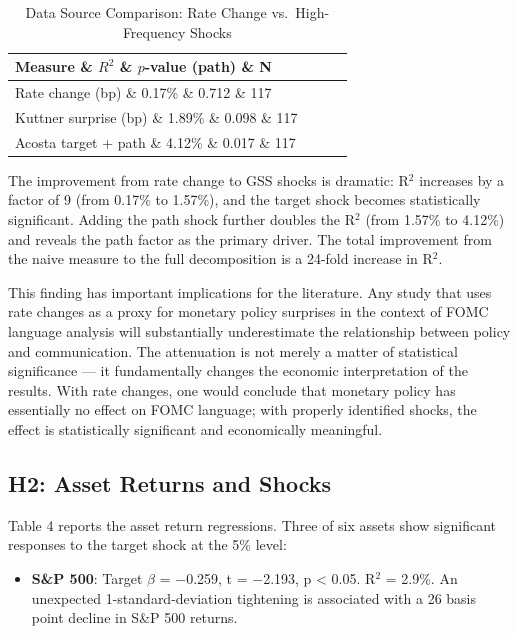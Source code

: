 \begin{table}[htbp]
\centering
\caption{Data Source Comparison: Rate Change vs.\ High-Frequency Shocks}
\label{tab:comparison}
\begin{tabular}{lccc}
\toprule
Measure \& $R^2$ \& $p$-value (path) \& N \\
\midrule
Rate change (bp) \& 0.17\% \& 0.712 \& 117 \\
Kuttner surprise (bp) \& 1.89\% \& 0.098 \& 117 \\
Acosta target + path \& 4.12\% \& 0.017 \& 117 \\
\bottomrule
\end{tabular}
\par\vspace{2pt}{\footnotesize All regressions include Newey-West HAC standard errors with lag=4.}
\end{table}


The improvement from rate change to GSS shocks is dramatic: R$^2$ increases by a factor of 9 (from 0.17\% to 1.57\%), and the target shock becomes statistically significant. Adding the path shock further doubles the R$^2$ (from 1.57\% to 4.12\%) and reveals the path factor as the primary driver. The total improvement from the naive measure to the full decomposition is a 24-fold increase in R$^2$.

This finding has important implications for the literature. Any study that uses rate changes as a proxy for monetary policy surprises in the context of FOMC language analysis will substantially underestimate the relationship between policy and communication. The attenuation is not merely a matter of statistical significance --- it fundamentally changes the economic interpretation of the results. With rate changes, one would conclude that monetary policy has essentially no effect on FOMC language; with properly identified shocks, the effect is statistically significant and economically meaningful.

\subsection{H2: Asset Returns and Shocks}

Table 4 reports the asset return regressions. Three of six assets show significant responses to the target shock at the 5\% level:

\begin{itemize}
\item \textbf{S\&P 500}: Target $\beta$ = $-$0.259, t = $-$2.193, p < 0.05. R$^2$ = 2.9\%. An unexpected 1-standard-deviation tightening is associated with a 26 basis point decline in S\&P 500 returns.
\end{itemize}

